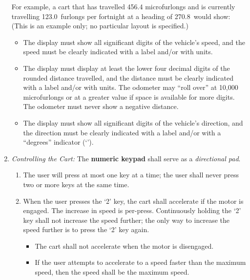 \begin{enumerate}
        For example, a cart that has travelled 456.4 microfurlongs and is currently travelling 123.0~furlongs per fortnight at a heading of 270.8\textdegree\ would show: \\
        (This is an example only; no particular layout is specified.)
        \begin{itemize}
            \item The display must show all significant digits of the vehicle's speed, and the speed must be clearly indicated with a label and/or with units.
            \item The display must display at least the lower four decimal digits of the rounded distance travelled, and the distance must be clearly indicated with a label and/or with units.
                The odometer may ``roll over'' at 10,000 microfurlongs or at a greater value if space is available for more digits.
                The odometer must never show a negative distance.
            \item The display must show all significant digits of the vehicle's direction, and the direction must be clearly indicated with a label and/or with a ``degrees'' indicator (`\textdegree').
        \end{itemize}
    \item \label{spec:dPad} \textit{Controlling the Cart:} The \textbf{numeric keypad} shall serve as a \textit{directional pad}.
    \begin{enumerate}
        \item \label{spec:pressOnlyOneKey} The user will press at most one key at a time;
            the user shall never press two or more keys at the same time.
        \item When the user presses the `2' key, the cart shall accelerate if the motor is engaged.
            The increase in speed is per-press.
            Continuously holding the `2' key shall not increase the speed further;
            the only way to increase the speed further is to press the `2' key again.
            \begin{itemize}
                \item The cart shall not accelerate when the motor is disengaged.
                \item If the user attempts to accelerate to a speed faster than the maximum speed, then the speed shall be the maximum speed.

\end{itemize}
\end{enumerate}
\end{enumerate}
